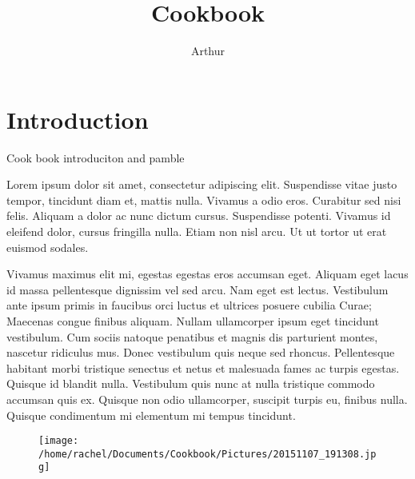 \documentclass{article}
\title{Cookbook}
\author{Arthur}
\date{ }
\begin{document}
\maketitle


\newpage
\tableofcontents
 
\newlength{\imagewidth}  %

\newpage
\section*{\fontsize{25}{15}\selectfont Introduction}

Cook book introduciton and pamble

Lorem ipsum dolor sit amet, consectetur adipiscing elit. Suspendisse vitae justo tempor, tincidunt diam et, mattis nulla. Vivamus a odio eros. Curabitur sed nisi felis. Aliquam a dolor ac nunc dictum cursus. Suspendisse potenti. Vivamus id eleifend dolor, cursus fringilla nulla. Etiam non nisl arcu. Ut ut tortor ut erat euismod sodales.

Vivamus maximus elit mi, egestas egestas eros accumsan eget. Aliquam eget lacus id massa pellentesque dignissim vel sed arcu. Nam eget est lectus. Vestibulum ante ipsum primis in faucibus orci luctus et ultrices posuere cubilia Curae; Maecenas congue finibus aliquam. Nullam ullamcorper ipsum eget tincidunt vestibulum. Cum sociis natoque penatibus et magnis dis parturient montes, nascetur ridiculus mus. Donec vestibulum quis neque sed rhoncus. Pellentesque habitant morbi tristique senectus et netus et malesuada fames ac turpis egestas. Quisque id blandit nulla. Vestibulum quis nunc at nulla tristique commodo accumsan quis ex. Quisque non odio ullamcorper, suscipit turpis eu, finibus nulla. Quisque condimentum mi elementum mi tempus tincidunt.





\newpage
\begin{figure}[]
\texttt{[image: /home/rachel/Documents/Cookbook/Pictures/20151107\_191308.jpg]}
\end{figure}
\restoregeometry
\clearpage
\newpage
{}
\end{document}
